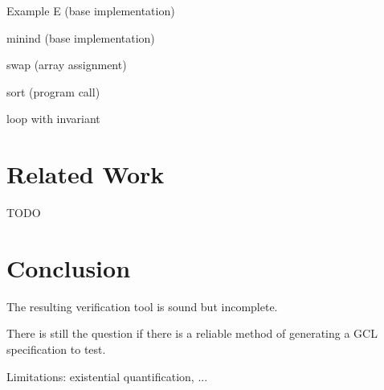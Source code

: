 \documentclass[a4paper]{article}
\begin{document}
Example E (base implementation)

minind (base implementation)

swap (array assignment)

sort (program call)

loop with invariant



\section{Related Work}

TODO

\section{Conclusion}

The resulting verification tool is sound but incomplete.

There is still the question if there is a reliable method of generating a GCL
specification to test.

Limitations: existential quantification, ...



\end{document}
